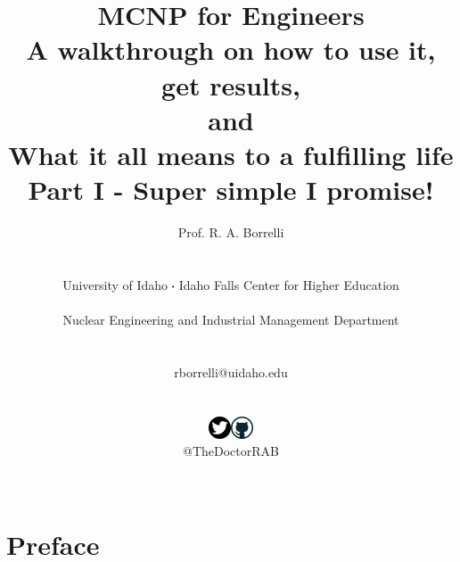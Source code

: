 \documentclass[11pt,a4paper]{article}
\newcommand*\sq{\mathbin{\vcenter{\hbox{\rule{.3ex}{.3ex}}}}} %
\begin{document}
\begin{titlepage}
    \title{
        \textbf{MCNP for Engineers}\\
        A walkthrough on how to use it, get results,\\
        and\\
        What it all means to a fulfilling life\\
        Part I - Super simple I promise!
    }
    \author{
        Prof. R. A. Borrelli
        \\ \\ \\
        University of Idaho $\sq$ Idaho Falls Center for Higher Education
        \\ \\
        Nuclear Engineering and Industrial Management Department
        \\ \\ \\
        rborrelli@uidaho.edu
        \\ \\ \\
        \includegraphics{twitter.png}\includegraphics{git.png}\\
        @TheDoctorRAB\\ \\
    }
\clearpage %
\maketitle
\thispagestyle{empty} %
\end{titlepage}


\section{Preface} \label{preface}
\end{document}
